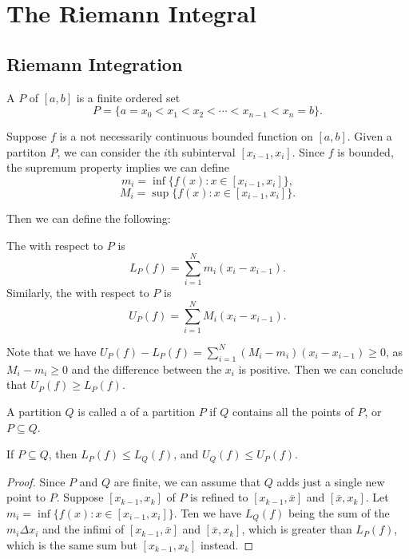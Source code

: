 \chapter{The Riemann Integral}

\section{Riemann Integration}
\begin{definition}
A  $P$ of $[a,b]$ is a finite ordered set
\[ P = \{a = x_0 < x_1 < x_2 < \cdots < x_{n-1} < x_n = b \}. \]
\end{definition}

Suppose $f$ is a not necessarily continuous bounded function on $[a,b]$. Given a partiton $P$, we can consider the $i$th subinterval $[x_{i-1}, x_i]$. Since $f$ is bounded, the supremum property implies we can define 
\[ m_i = \inf{\{f(x) : x \in [x_{i-1}, x_i] \}}, \]
\[ M_i = \sup{\{f(x) : x \in [x_{i-1}, x_i]\}}. \]

Then we can define the following:
\begin{definition}
The  with respect to $P$ is 
\[ L_P(f) = \sum_{i=1}^N m_i(x_i - x_{i-1}). \]
Similarly, the  with respect to $P$ is 
\[ U_P(f) = \sum_{i=1}^N M_i(x_i - x_{i-1}). \]
\end{definition}

Note that we have $U_P(f) - L_P(f) = \displaystyle\sum_{i=1}^N (M_i - m_i)(x_i - x_{i-1}) \geq 0$, as $M_i - m_i \geq 0$ and the difference between the $x_i$ is positive. Then we can conclude that $U_P(f) \geq L_P(f)$. 

\begin{definition}
A partition $Q$ is called a  of a partition $P$ if $Q$ contains all the points of $P$, or $P \subseteq Q$. 
\end{definition}

\begin{lemma*}
If $P \subseteq Q$, then $L_P(f) \leq L_Q(f)$, and $U_Q(f) \leq U_P(f)$. 
\end{lemma*}
\begin{proof}
Since $P$ and $Q$ are finite, we can assume that $Q$ adds just a single new point to $P$. Suppose $[x_{k-1}, x_k]$ of $P$ is refined to $[x_{k-1}, \overline{x}]$ and $[\overline{x}, x_k]$. Let $m_i = \inf{\{f(x): x \in [x_{i-1}, x_i]\}}$. Ten we have $L_Q(f)$ being the sum of the $m_i\Delta x_i$ and the infimi of $[x_{k-1}, \overline{x}]$ and $[\overline{x},x_k]$, which is greater than $L_P(f)$, which is the same sum but $[x_{k-1}, x_k]$ instead. 
\end{proof}

